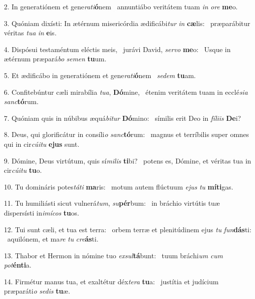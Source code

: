 2. In generatiónem et gene\textit{ra}\textit{ti}\textbf{ó}nem \ast\  annuntiábo veritátem tuam \textit{in} \textit{o}\textit{re} \textbf{me}o.\

3. Quóniam dixísti: In ætérnum misericórdia ædificábi\textit{tur} \textit{in} \textbf{cæ}lis: \ast\  præparábitur véritas \textit{tu}\textit{a} \textit{in} \textbf{e}is.\

4. Dispósui testaméntum eléctis meis, \dag\  jurávi David, \textit{ser}\textit{vo} \textbf{me}o: \ast\  Usque in ætérnum præpará\textit{bo} \textit{se}\textit{men} \textbf{tu}um.\

5. Et ædificábo in generatiónem et gene\textit{ra}\textit{ti}\textbf{ó}nem \ast\  \textit{se}\textit{dem} \textbf{tu}am.\

6. Confitebúntur cæli mirabília \textit{tu}\textit{a}, \textbf{Dó}mine, \ast\  étenim veritátem tuam in ecclé\textit{si}\textit{a} \textit{sanc}\textbf{tó}rum.\

7. Quóniam quis in núbibus æquá\textit{bi}\textit{tur} \textbf{Dó}mino: \ast\  símilis erit Deo in \textit{fí}\textit{li}\textit{is} \textbf{De}i?\

8. Deus, qui glorificátur in consíli\textit{o} \textit{sanc}\textbf{tó}rum: \ast\  magnus et terríbilis super omnes qui in cir\textit{cú}\textit{i}\textit{tu} \textbf{e}\textbf{jus} sunt.\

9. Dómine, Deus virtútum, quis sí\textit{mi}\textit{lis} \textbf{ti}bi? \ast\  potens es, Dómine, et véritas tua in cir\textit{cú}\textit{i}\textit{tu} \textbf{tu}o.\

10. Tu domináris potes\textit{tá}\textit{ti} \textbf{ma}ris: \ast\  motum autem flúctuum \textit{e}\textit{jus} \textit{tu} \textbf{mí}\textbf{ti}gas.\

11. Tu humiliásti sicut vulnerá\textit{tum}, \textit{su}\textbf{pér}bum: \ast\  in bráchio virtútis tuæ dispersísti in\textit{i}\textit{mí}\textit{cos} \textbf{tu}os.\

12. Tui sunt cæli, et tua est terra: \dag\  orbem terræ et plenitúdinem ejus \textit{tu} \textit{fun}\textbf{dás}ti: \ast\  aquilónem, et ma\textit{re} \textit{tu} \textit{cre}\textbf{ás}ti.\

13. Thabor et Hermon in nómine tuo \textit{ex}\textit{sul}\textbf{tá}bunt: \ast\  tuum bráchi\textit{um} \textit{cum} \textit{pot}\textbf{én}\textbf{ti}a.\

14. Firmétur manus tua, et exaltétur déx\textit{te}\textit{ra} \textbf{tu}a: \ast\  justítia et judícium præparáti\textit{o} \textit{se}\textit{dis} \textbf{tu}æ.\

